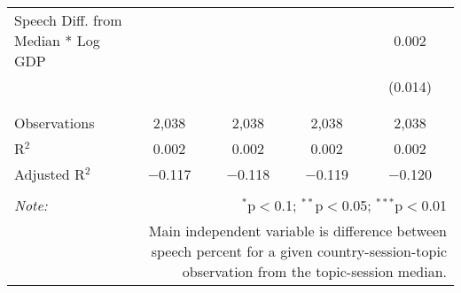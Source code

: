 \begin{table}[!htbp]
\begin{tabular}{@{\extracolsep{5pt}}lcccc}
 Speech Diff. from Median * Log GDP &  &  &  & 0.002 \\ 
  &  &  &  & (0.014) \\ 
  & & & & \\ 
\hline \\[-1.8ex] 
Observations & 2,038 & 2,038 & 2,038 & 2,038 \\ 
R$^{2}$ & 0.002 & 0.002 & 0.002 & 0.002 \\ 
Adjusted R$^{2}$ & $-$0.117 & $-$0.118 & $-$0.119 & $-$0.120 \\ 
\hline 
\hline \\[-1.8ex] 
\textit{Note:}  & \multicolumn{4}{r}{$^{*}$p$<$0.1; $^{**}$p$<$0.05; $^{***}$p$<$0.01} \\ 
 & \multicolumn{4}{r}{Main independent variable is difference between speech percent for a given country-session-topic observation from the topic-session median.} \\ 
\end{tabular} 
\end{table} 
